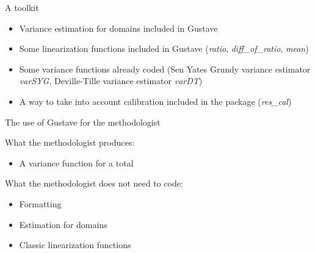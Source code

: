 \documentclass[xcolor=dvipsnames]{beamer}
\begin{document}
\begin{frame}{A toolkit}

\begin{itemize}
    
    \item Variance estimation for domains included in Gustave
    
    \vspace{0.2 cm}
    
    \item Some linearization functions included in Gustave (\textit{ratio}, \textit{diff\_of\_ratio}, \textit{mean})
    
    \vspace{0.2 cm}

    \item Some variance functions already coded (Sen Yates Grundy variance estimator \textit{varSYG}, Deville-Tille variance estimator \textit{varDT})
    
    \vspace{0.2 cm}

    \item A way to take into account calibration included in the package (\textit{res\_cal})

\end{itemize}
    
\end{frame}



\begin{frame}{The use of Gustave for the methodologist}

What the methodologist produces:

\vspace{0.1 cm}

\begin{itemize}
    
    \item A variance function for a total
    
\end{itemize}

\vspace{0.5 cm}

What the methodologist does not need to code:

\vspace{0.1 cm}

\begin{itemize}
    
    \item Formatting
    
    \vspace{0.1 cm}

    \item Estimation for domains
    
    \vspace{0.1 cm}
    
    \item Classic linearization functions

\end{itemize}
       
\end{frame}
\end{document}
